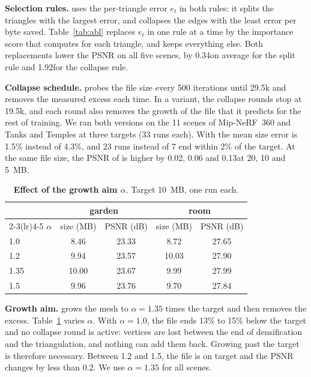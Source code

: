 \noindent\textbf{Selection rules.} \BM uses the per-triangle error $e_t$ in both rules: it splits the triangles with the largest error, and collapses the edges with the least error per byte saved. Table~\ref{tab:abl} replaces $e_t$ in one rule at a time by the importance score that \MS computes for each triangle, and keeps everything else. Both replacements lower the PSNR on all five scenes, by 0.34\dB on average for the split rule and 1.92\dB for the collapse rule.

\noindent\textbf{Collapse schedule.} \BM probes the file size every 500 iterations until 29.5k and removes the measured excess each time. In a variant, the collapse rounds stop at 19.5k, and each round also removes the growth of the file that it predicts for the rest of training. We ran both versions on the 11 scenes of Mip-NeRF~360 and Tanks and Temples at three targets (33 runs each). With \BM the mean size error is 1.5\% instead of 4.3\%, and 23 runs instead of 7 end within 2\% of the target. At the same file size, the PSNR of \BM is higher by 0.02, 0.06 and 0.13\dB at 20, 10 and 5~MB.

\begin{table}[t]\centering\footnotesize
\caption{\textbf{Effect of the growth aim $\alpha$}. Target 10~MB, one run each.}
\label{tab:alpha}
\setlength{\tabcolsep}{5pt}
\begin{tabular}{@{}lcccc@{}}
\toprule
 & \multicolumn{2}{c}{garden} & \multicolumn{2}{c}{room} \\
\cmidrule(lr){2-3}\cmidrule(lr){4-5}
$\alpha$ & size (MB) & PSNR (dB) & size (MB) & PSNR (dB) \\
\midrule
1.0 & 8.46 & 23.33 & 8.72 & 27.65 \\
1.2 & 9.94 & 23.57 & 10.03 & 27.90 \\
1.35 & 10.00 & 23.67 & 9.99 & 27.99 \\
1.5 & 9.96 & 23.76 & 9.70 & 27.84 \\
\bottomrule
\end{tabular}
\end{table}

\noindent\textbf{Growth aim.} \BM grows the mesh to $\alpha = 1.35$ times the target and then removes the excess. Table~\ref{tab:alpha} varies $\alpha$. With $\alpha = 1.0$, the file ends 13\% to 15\% below the target and no collapse round is active: vertices are lost between the end of densification and the triangulation, and nothing can add them back. Growing past the target is therefore necessary. Between 1.2 and 1.5, the file is on target and the PSNR changes by less than 0.2\dB. We use $\alpha = 1.35$ for all scenes.

